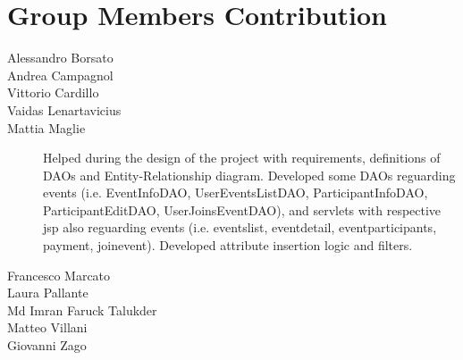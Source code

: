 \section{Group Members Contribution}



\begin{description}
	\item[Alessandro Borsato] \lipsum[1]
	\item[Andrea Campagnol]\lipsum[1]
	\item[Vittorio Cardillo] \lipsum[1]
	\item[Vaidas Lenartavicius] \lipsum[1]
	\item[Mattia Maglie] Helped during the design of the project with requirements, definitions of DAOs and Entity-Relationship diagram. Developed some DAOs reguarding events (i.e. EventInfoDAO, UserEventsListDAO, ParticipantInfoDAO, ParticipantEditDAO, UserJoinsEventDAO), and servlets with respective jsp also reguarding events (i.e. eventslist, eventdetail, eventparticipants, payment, joinevent). Developed attribute insertion logic and filters.
	\item[Francesco Marcato] \lipsum[1]
	\item[Laura Pallante] \lipsum[1]
	\item[Md Imran Faruck Talukder] \lipsum[1]
	\item[Matteo Villani] \lipsum[1]
	\item[Giovanni Zago]\lipsum[1]
\end{description}